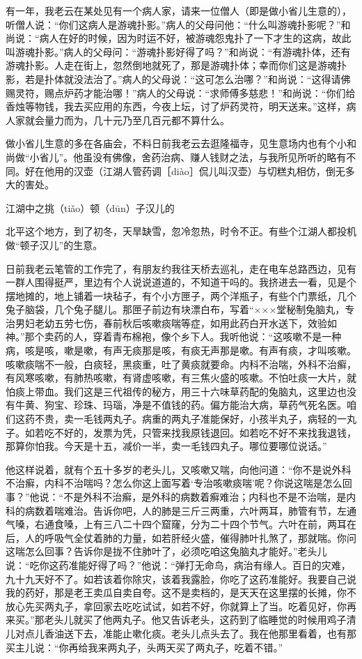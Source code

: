 \documentclass[12pt,UTF8]{ctexbook}
\begin{document}
有一年，我老云在某处见有一个病人家，请来一位僧人（即是做小省儿生意的），听僧人说：“你们这病人是游魂扑影。”病人的父母问他：“什么叫游魂扑影呢？”和尚说：“病人在好的时候，因为时运不好，被游魂怨鬼扑了一下才生的这病，故此叫游魂扑影。”病人的父母问：“游魂扑影好得了吗？”和尚说：“有游魂扑体，还有游魂扑影。人走在街上，忽然倒地就死了，那是游魂扑体；幸而你们这是游魂扑影，若是扑体就没法治了。”病人的父母说：“这可怎么治哪？”和尚说：“这得请佛赐灵符，赐点炉药才能治哪！”病人的父母说：“求师傅多慈悲！”和尚说：“你们给香烛等物钱，我去买应用的东西，今夜上坛，讨了炉药灵符，明天送来。”这样，病人家就会量力而为，几十元乃至几百元都不算什么。

做小省儿生意的多在各庙会，不料日前我老云去逛隆福寺，见生意场内也有个小和尚做“小省儿”。他虽没有佛像，舍药治病、赚人钱财之法，与我所见所听的略有不同。好在他用的汉壶（江湖人管药调［diào］侃儿叫汉壶）与切糕丸相仿，倒无多大的害处。





江湖中之挑（tiǎo）顿（dūn）子汉儿的


北平这个地方，到了初冬，天旱缺雪，忽冷忽热，时令不正。有些个江湖人都投机做“顿子汉儿”的生意。

日前我老云笔管的工作完了，有朋友约我往天桥去巡礼，走在电车总路西边，见有一群人围得挺严，里边有个人说说道道的，不知道干吗的。我挤进去一看，见是个摆地摊的，地上铺着一块毡子，有个小方匣子，两个洋瓶子，有些个门票纸，几个兔子脑袋，几个兔子腿儿。那匣子前边有块漂白布，写着“×××堂秘制兔脑丸，专治男妇老幼五劳七伤，春前秋后咳嗽痰喘等症，如用此药白开水送下，效验如神。”那个卖药的人，穿着青布棉袍，像个乡下人。我听他说：“这咳嗽不是一种病，咳是咳，嗽是嗽，有声无痰那是咳，有痰无声那是嗽。有声有痰，才叫咳嗽。咳嗽痰喘不一般，白痰轻，黑痰重，吐了黄痰就要命。内科不治喘，外科不治癣，有风寒咳嗽，有肺热咳嗽，有肾虚咳嗽，有三焦火盛的咳嗽。不怕吐痰一大片，就怕痰上带血。我们这是三代祖传的秘方，用三十六味草药配的兔脑丸，这里边也没有牛黄、狗宝、珍珠、玛瑙，净是不值钱的药。偏方能治大病，草药气死名医。咱们这药不贵，卖一毛钱两丸子。病重的两丸子准能保好，小孩半丸子，病轻的一丸子。如若吃不好的，发票为凭，只管来找我原钱退回。如若吃不好不来找我退钱，那算你怕我。今天是十五，减价一半，卖一毛钱四丸子。哪位要哪位说话。”

他这样说着，就有个五十多岁的老头儿，又咳嗽又喘，向他问道：“你不是说外科不治癣，内科不治喘吗？怎么你这上面写着‘专治咳嗽痰喘’呢？你说这喘是怎么回事？”他说：“不是外科不治癣，是外科的病数着癣难治；内科也不是不治喘，是内科的病数着喘难治。告诉你吧，人的肺是三斤三两重，六叶两耳，肺管有节，左通气嗓，右通食嗓，上有三八二十四个窟窿，分为二十四个节气。六叶在前，两耳在后，人的呼吸气全仗着肺的力量，如若肝经火盛，催得肺叶扎煞了，那就喘。你问这喘怎么回事？告诉你是拢不住肺叶了，必须吃咱这兔脑丸才能好。”老头儿说：“吃你这药准能好得了吗？”他说：“弹打无命鸟，病治有缘人。百日的灾难，九十九天好不了。如若该着你除灾，该着我露脸，你吃了这药准能好。我要自己说我的药好，那是老王卖瓜自卖自夸。这不是卖档的，是天天在这里摆的长摊，你不放心先买两丸子，拿回家去吃吃试试，如若不好，你就算上了当。吃着见好，你再来买。”那老头儿就买了他两丸子。他又告诉老头，这药到了临睡觉的时候用鸡子清儿对点儿香油送下去，准能止嗽化痰。老头儿点头去了。我在他那里看着，也有那买主儿说：“你再给我来两丸子，头两天买了两丸子，吃着不错。”
\end{document}
